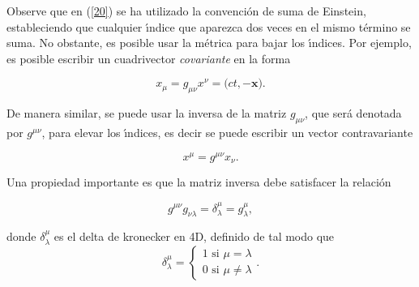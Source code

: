 Observe que en (\ref{20}) se ha utilizado la convenci\'{o}n de suma de Einstein, estableciendo que cualquier \'{\i}ndice que aparezca dos veces en el mismo t\'{e}rmino se
suma. No obstante, es posible usar la m\'{e}trica para bajar los \'{\i}ndices. Por ejemplo, es posible escribir un cuadrivector \emph{covariante }%
en la forma 

\begin{equation}
x_{\mu }=g_{\mu \nu }x^{\nu }=(ct,-\mathbf{x)}  \label{22}.
\end{equation}

De manera similar, se puede usar la inversa de la matriz $g_{\mu \nu }$, que
ser\'{a} denotada por $g^{\mu \nu }$, para elevar los \'{\i}ndices, es decir
se puede escribir un vector contravariante

\begin{equation}
x^{\mu }=g^{\mu \nu }x_{\nu }  \label{23}.
\end{equation}

Una propiedad importante es que la matriz inversa debe satisfacer la relaci\'{o}n

\begin{equation}
g^{\mu \nu }g_{\nu \lambda }=\delta _{\lambda }^{\mu }=g_{\lambda }^{\mu },
\label{24}
\end{equation}

donde $\delta _{\lambda }^{\mu }$ es el delta de kronecker en 4D, definido de tal modo que
\begin{equation}
\delta _{\lambda }^{\mu }=\left\{ 
\begin{array}{c}
1\text{ si }\mu =\lambda  \\ 
0\text{ si }\mu \neq \lambda 
\end{array}%
\right. \text{.}  \label{25}
\end{equation}

